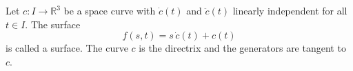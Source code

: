 Let $c: I \to \mathbb{R}^3$ be a space curve with $\dot{c}(t)$ and $\ddot{c}(t)$ linearly independent for all $t \in I$. The surface
$$f(s, t) = s\,\dot{c}(t) + c(t)$$
is called a  surface. The curve $c$ is the directrix and the generators are tangent to $c$.
